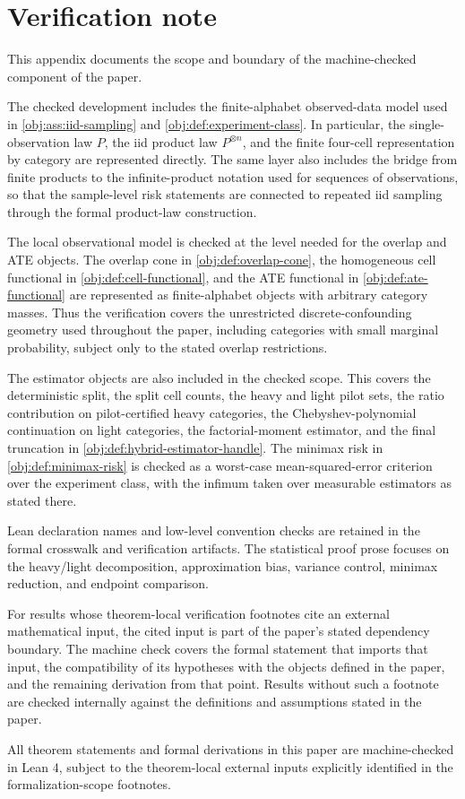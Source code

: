 \section{Verification note}

This appendix documents the scope and boundary of the machine-checked component of the paper.

The checked development includes the finite-alphabet observed-data model used in \cref{obj:ass:iid-sampling} and \cref{obj:def:experiment-class}. In particular, the single-observation law \(P\), the iid product law \(P^{\otimes n}\), and the finite four-cell representation by category are represented directly. The same layer also includes the bridge from finite products to the infinite-product notation used for sequences of observations, so that the sample-level risk statements are connected to repeated iid sampling through the formal product-law construction.

The local observational model is checked at the level needed for the overlap and ATE objects. The overlap cone in \cref{obj:def:overlap-cone}, the homogeneous cell functional in \cref{obj:def:cell-functional}, and the ATE functional in \cref{obj:def:ate-functional} are represented as finite-alphabet objects with arbitrary category masses. Thus the verification covers the unrestricted discrete-confounding geometry used throughout the paper, including categories with small marginal probability, subject only to the stated overlap restrictions.

The estimator objects are also included in the checked scope. This covers the deterministic split, the split cell counts, the heavy and light pilot sets, the ratio contribution on pilot-certified heavy categories, the Chebyshev-polynomial continuation on light categories, the factorial-moment estimator, and the final truncation in \cref{obj:def:hybrid-estimator-handle}. The minimax risk in \cref{obj:def:minimax-risk} is checked as a worst-case mean-squared-error criterion over the experiment class, with the infimum taken over measurable estimators as stated there.

Lean declaration names and low-level convention checks are retained in the formal crosswalk and verification artifacts. The statistical proof prose focuses on the heavy/light decomposition, approximation bias, variance control, minimax reduction, and endpoint comparison.

For results whose theorem-local verification footnotes cite an external mathematical input, the cited input is part of the paper's stated dependency boundary. The machine check covers the formal statement that imports that input, the compatibility of its hypotheses with the objects defined in the paper, and the remaining derivation from that point. Results without such a footnote are checked internally against the definitions and assumptions stated in the paper.

All theorem statements and formal derivations in this paper are machine-checked in Lean 4, subject to the theorem-local external inputs explicitly identified in the formalization-scope footnotes.
